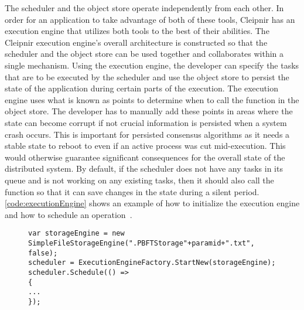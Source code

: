 The scheduler and the object store operate independently from each other. In order for an application to take advantage of both of these tools, Cleipnir has an execution engine that utilizes both tools to the best of their abilities.
The Cleipnir execution engine's overall architecture is constructed so that the scheduler and the object store can be used together and collaborates within a single mechanism. Using the execution engine, the developer can specify the tasks that are to be executed by the scheduler and use the object store to persist the state of the application during certain parts of the execution. The execution engine uses what is known as  points to determine when to call the  function in the object store. The developer has to manually add these points in areas where the state can become corrupt if not crucial information is persisted when a system crash occurs. This is important for persisted consensus algorithms as it needs a stable state to reboot to even if an active process was cut mid-execution.  This would otherwise guarantee significant consequences for the overall state of the distributed system.
By default, if the scheduler does not have any tasks in its queue and is not working on any existing tasks, then it should also call the  function so that it can save changes in the state during a silent period. \autoref{code:executionEngine} shows an example of how to initialize the execution engine and how to schedule an operation~\cite[p.~11]{PAPER:PaxosCleipnir}.


\begin{figure}[H]
	\centering
	\begin{lstlisting}[label = code:executionEngine, caption=Execution engine example, captionpos=b, basicstyle=\scriptsize]
var storageEngine = new SimpleFileStorageEngine(".PBFTStorage"+paramid+".txt", false);
scheduler = ExecutionEngineFactory.StartNew(storageEngine);
scheduler.Schedule(() =>
{
...
});
	\end{lstlisting}
\end{figure}

\iffalse

